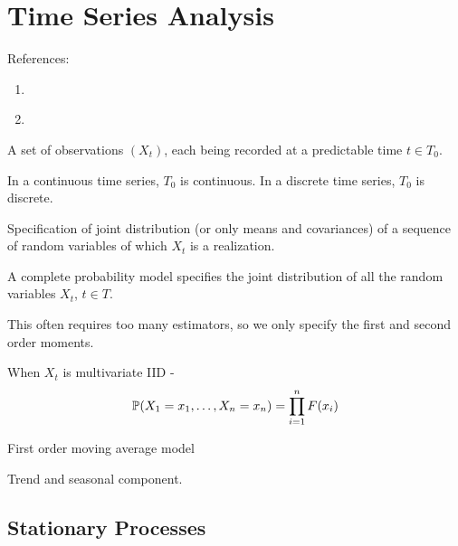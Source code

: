 
\chapter{Time Series Analysis}
\label{cha:time-series-analysis}

References: 
\begin{enumerate}
\item \citet{brockwell2009time}
\item \citet{brockwell2002introduction}
\end{enumerate}

\begin{defn}
  \label{defn:time_series:1}
  A set of observations $(X_{t})$, each being recorded at a predictable
  time $t \in T_{0}$.

  In a continuous time series, $T_{0}$ is continuous.  In a discrete
  time series, $T_{0}$ is discrete.
\end{defn}

\begin{defn}
  \label{defn:time_series:2}
  Specification of joint distribution (or only means and covariances)
  of a sequence of random variables of which $X_{t}$ is a realization.
\end{defn}

\begin{remark}
  A complete probability model specifies the joint distribution of all
  the random variables $X_{t}$, $t \in T$.

  This often requires too many estimators, so we only specify the
  first and second order moments.
\end{remark}

\begin{exmp}
  \label{defn:time_series:3}
  When $X_{t}$ is multivariate IID -
  \begin{equation}
    \label{eq:1}
    \Prob{X_{1} = x_{1}, \dots, X_{n} = x_{n}} = \prod_{i=1}^{n} F(x_{i})
  \end{equation}
\end{exmp}

\begin{exmp}
  \label{defn:time_series:4}
  First order moving average model
\end{exmp}

\begin{exmp}
  \label{defn:time_series:5}
  Trend and seasonal component.
\end{exmp}

\section{Stationary Processes}
\label{sec:stationary-processes}

